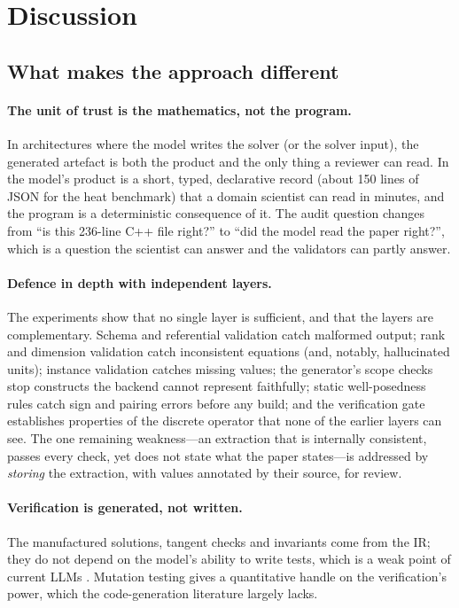 \section{Discussion}
\label{sec:discussion}

\subsection{What makes the approach different}
\paragraph{The unit of trust is the mathematics, not the program.} In architectures where the model writes the solver (or the solver input), the generated artefact is both the product and the only thing a reviewer can read. In \femagent{} the model's product is a short, typed, declarative record (about 150 lines of JSON for the heat benchmark) that a domain scientist can read in minutes, and the program is a deterministic consequence of it. The audit question changes from ``is this 236-line C++ file right?'' to ``did the model read the paper right?'', which is a question the scientist can answer and the validators can partly answer.

\paragraph{Defence in depth with independent layers.} The experiments show that no single layer is sufficient, and that the layers are complementary. Schema and referential validation catch malformed output; rank and dimension validation catch inconsistent equations (and, notably, hallucinated units); instance validation catches missing values; the generator's scope checks stop constructs the backend cannot represent faithfully; static well-posedness rules catch sign and pairing errors before any build; and the verification gate establishes properties of the discrete operator that none of the earlier layers can see. The one remaining weakness---an extraction that is internally consistent, passes every check, yet does not state what the paper states---is addressed by \emph{storing} the extraction, with values annotated by their source, for review.

\paragraph{Verification is generated, not written.} The manufactured solutions, tangent checks and invariants come from the IR; they do not depend on the model's ability to write tests, which is a weak point of current LLMs \citep{fembench2025}. Mutation testing gives a quantitative handle on the verification's power, which the code-generation literature largely lacks.


